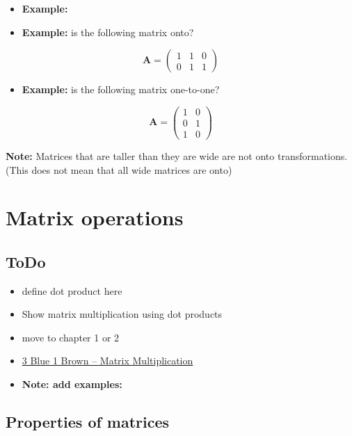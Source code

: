 \documentclass[
]{book}
\providecommand{\tightlist}{%
  \setlength{\itemsep}{0pt}\setlength{\parskip}{0pt}}
\theoremstyle{definition}
\theoremstyle{definition}
\theoremstyle{definition}
\theoremstyle{remark}
\begin{document}
\begin{itemize}
\item
  \textbf{Example:}
\item
  \textbf{Example:} is the following matrix onto?
\end{itemize}

\[
\mathbf{A} = \begin{pmatrix}
1 & 1 & 0 \\
0 & 1 & 1
\end{pmatrix}
\]

\begin{itemize}
\tightlist
\item
  \textbf{Example:} is the following matrix one-to-one?
\end{itemize}

\[
\mathbf{A} = \begin{pmatrix}
1 & 0  \\
0 & 1  \\
1 & 0
\end{pmatrix}
\]

\textbf{Note:} Matrices that are taller than they are wide are not onto transformations. (This does not mean that all wide matrices are onto)

\hypertarget{matrix-operations}{%
\chapter{Matrix operations}\label{matrix-operations}}

\hypertarget{todo}{%
\section{ToDo}\label{todo}}

\begin{itemize}
\item
  define dot product here
\item
  Show matrix multiplication using dot products
\item
  move to chapter 1 or 2
\item
  \href{https://www.3blue1brown.com/lessons/matrix-multiplication}{3 Blue 1 Brown -- Matrix Multiplication}
\item
  \textbf{Note: add examples:}
\end{itemize}

\hypertarget{properties-of-matrices}{%
\section{Properties of matrices}\label{properties-of-matrices}}
\end{document}
